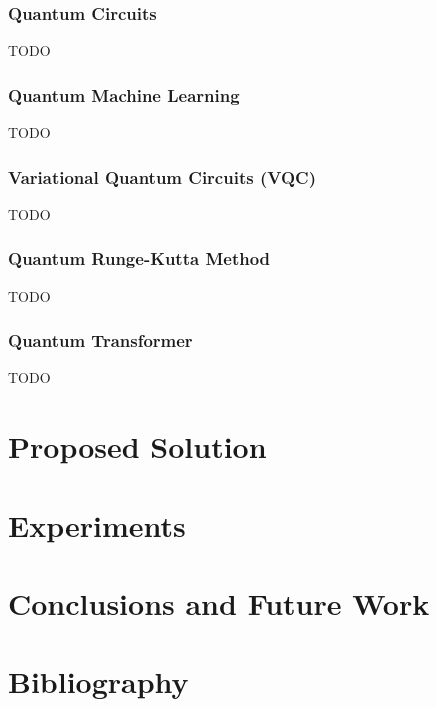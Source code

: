 \documentclass[12pt,a4paper]{report}
\begin{document}
\subsection{Quantum Circuits}
TODO

\subsection{Quantum Machine Learning}
TODO

\subsection{Variational Quantum Circuits (VQC)}
TODO

\subsection{Quantum Runge-Kutta Method}
TODO

\subsection{Quantum Transformer}
TODO

\chapter{Proposed Solution}\pagestyle{fancy}

\chapter{Experiments}\pagestyle{fancy}

\chapter{Conclusions and Future Work}\pagestyle{fancy}

\chapter{Bibliography}\pagestyle{fancy}



\begingroup
\def\chapter*#1{}

\endgroup
\end{document}
